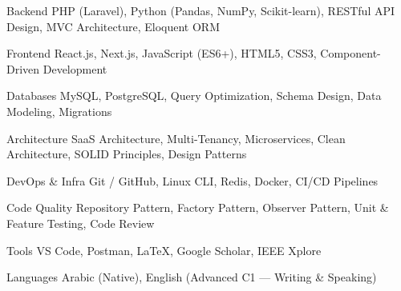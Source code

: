 

\begin{cvskills}

  \cvskill
    {Backend}
    {PHP (Laravel), Python (Pandas, NumPy, Scikit-learn), RESTful API Design, MVC Architecture, Eloquent ORM}

  \cvskill
    {Frontend}
    {React.js, Next.js, JavaScript (ES6+), HTML5, CSS3, Component-Driven Development}

  \cvskill
    {Databases}
    {MySQL, PostgreSQL, Query Optimization, Schema Design, Data Modeling, Migrations}

  \cvskill
    {Architecture}
    {SaaS Architecture, Multi-Tenancy, Microservices, Clean Architecture, SOLID Principles, Design Patterns}

  \cvskill
    {DevOps \& Infra}
    {Git / GitHub, Linux CLI, Redis, Docker, CI/CD Pipelines}

  \cvskill
    {Code Quality}
    {Repository Pattern, Factory Pattern, Observer Pattern, Unit \& Feature Testing, Code Review}

  \cvskill
    {Tools}
    {VS Code, Postman, LaTeX, Google Scholar, IEEE Xplore}

  \cvskill
    {Languages}
    {Arabic (Native), English (Advanced C1 — Writing \& Speaking)}

\end{cvskills}
